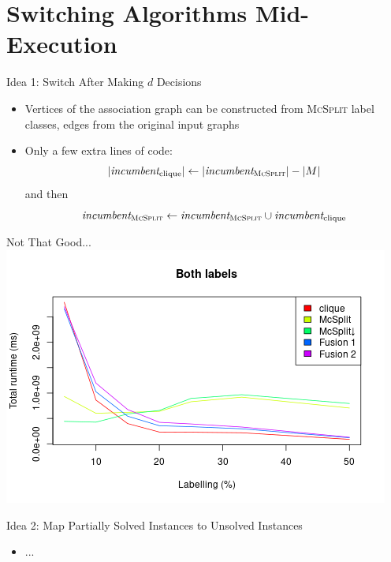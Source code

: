 \documentclass{beamer}
\begin{document}
\section{Switching Algorithms Mid-Execution}

\begin{frame}{Idea 1: Switch After Making $d$ Decisions}
  \pause
  \begin{itemize}
  \item Vertices of the association graph can be constructed from \textsc{McSplit}
    label classes, edges from the original input graphs
  \item Only a few extra lines of code:
    \[ |\textit{incumbent}_{\text{clique}}| \gets
      |\textit{incumbent}_{\text{\textsc{McSplit}}}| - |M| \]
    and then
    \[ \textit{incumbent}_{\textsc{McSplit}} \gets
      \textit{incumbent}_{\textsc{McSplit}} \cup
      \textit{incumbent}_{\text{clique}} \]
  \end{itemize}
\end{frame}

\begin{frame}{Not That Good...}
  \centering
  \includegraphics[scale=0.5]{../dissertation/images/fusion_linechart.png}
\end{frame}

\begin{frame}{Idea 2: Map Partially Solved Instances to Unsolved Instances}
  \begin{itemize}
  \item ...
  \end{itemize}
\end{frame}
\end{document}
